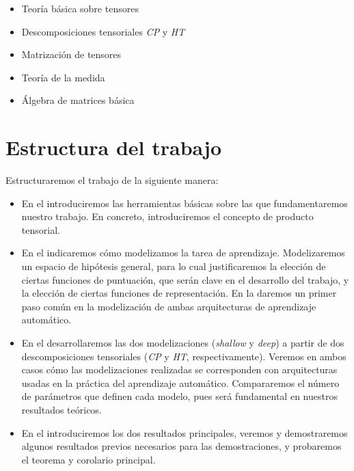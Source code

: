 \begin{itemize}
	\item Teoría básica sobre tensores
	\item Descomposiciones tensoriales \textit{CP} y \textit{HT}
	\item Matrización de tensores
	\item Teoría de la medida
	\item Álgebra de matrices básica
\end{itemize}

\section{Estructura del trabajo}

Estructuraremos el trabajo de la siguiente manera:

\begin{itemize}
	\item En el  introduciremos las herramientas básicas sobre las que fundamentaremos nuestro trabajo. En concreto, introduciremos el concepto de producto tensorial.
	\item En el  indicaremos cómo modelizamos la tarea de aprendizaje. Modelizaremos un espacio de hipótesis general, para lo cual justificaremos la elección de ciertas funciones de puntuación, que serán clave en el desarrollo del trabajo, y la elección de ciertas funciones de representación. En la  daremos un primer paso común en la modelización de ambas arquitecturas de aprendizaje automático.
	\item En el  desarrollaremos las dos modelizaciones (\textit{shallow} y \textit{deep}) a partir de dos descomposiciones tensoriales (\textit{CP} y \textit{HT}, respectivamente). Veremos en ambos casos cómo las modelizaciones realizadas se corresponden con arquitecturas usadas en la práctica del aprendizaje automático. Compararemos el número de parámetros que definen cada modelo, pues será fundamental en nuestros resultados teóricos.
	\item En el  introduciremos los dos resultados principales, veremos y demostraremos algunos resultados previos necesarios para las demostraciones, y probaremos el teorema y corolario principal.
\end{itemize}
